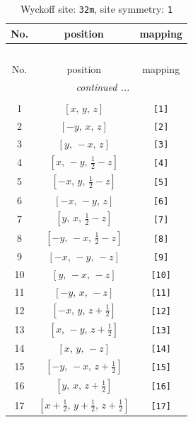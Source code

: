 \documentclass[fleqn,8pt]{jsarticle}
\begin{document}
\renewcommand{\arraystretch}{1.2}
\begin{longtable}{ccc}
\caption{Wyckoff site: {\tt 32m}, site symmetry: {\tt 1}}
 \\
 \hline \hline
No. & position & mapping \\ \hline \endfirsthead

\multicolumn{2}{l}{\tablename\ \thetable{}} \\
 \hline \hline
No. & position & mapping \\ \hline \endhead

 \hline \hline
\multicolumn{2}{r}{\footnotesize\it continued ...} \\ \endfoot

 \hline \hline
\multicolumn{2}{r}{} \\ \endlastfoot

1 & $\left[ x,\, y,\, z \right]$ & {\tt [1]} \\ \hline
2 & $\left[ - y,\, x,\, z \right]$ & {\tt [2]} \\ \hline
3 & $\left[ y,\, - x,\, z \right]$ & {\tt [3]} \\ \hline
4 & $\left[ x,\, - y,\, \frac{1}{2} - z \right]$ & {\tt [4]} \\ \hline
5 & $\left[ - x,\, y,\, \frac{1}{2} - z \right]$ & {\tt [5]} \\ \hline
6 & $\left[ - x,\, - y,\, z \right]$ & {\tt [6]} \\ \hline
7 & $\left[ y,\, x,\, \frac{1}{2} - z \right]$ & {\tt [7]} \\ \hline
8 & $\left[ - y,\, - x,\, \frac{1}{2} - z \right]$ & {\tt [8]} \\ \hline
9 & $\left[ - x,\, - y,\, - z \right]$ & {\tt [9]} \\ \hline
10 & $\left[ y,\, - x,\, - z \right]$ & {\tt [10]} \\ \hline
11 & $\left[ - y,\, x,\, - z \right]$ & {\tt [11]} \\ \hline
12 & $\left[ - x,\, y,\, z + \frac{1}{2} \right]$ & {\tt [12]} \\ \hline
13 & $\left[ x,\, - y,\, z + \frac{1}{2} \right]$ & {\tt [13]} \\ \hline
14 & $\left[ x,\, y,\, - z \right]$ & {\tt [14]} \\ \hline
15 & $\left[ - y,\, - x,\, z + \frac{1}{2} \right]$ & {\tt [15]} \\ \hline
16 & $\left[ y,\, x,\, z + \frac{1}{2} \right]$ & {\tt [16]} \\ \hline
17 & $\left[ x + \frac{1}{2},\, y + \frac{1}{2},\, z + \frac{1}{2} \right]$ & {\tt [17]} \\ \hline

\end{longtable}
\end{document}
